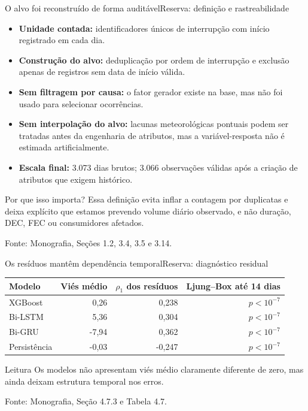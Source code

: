\documentclass[10pt]{beamer}
\newcommand{\source}[1]{%
  \par\vfill{\raggedleft\tiny\color{gray}Fonte: #1\par}%
}
\begin{document}
\begin{frame}[noframenumbering]{O alvo foi reconstruído de forma auditável}{Reserva: definição e rastreabilidade}
  \small
  \begin{itemize}
    \item \textbf{Unidade contada:} identificadores únicos de interrupção com início registrado em cada dia.
    \item \textbf{Construção do alvo:} deduplicação por ordem de interrupção e exclusão apenas de registros sem data de início válida.
    \item \textbf{Sem filtragem por causa:} o fator gerador existe na base, mas não foi usado para selecionar ocorrências.
    \item \textbf{Sem interpolação do alvo:} lacunas meteorológicas pontuais podem ser tratadas antes da engenharia de atributos, mas a variável-resposta não é estimada artificialmente.
    \item \textbf{Escala final:} 3.073 dias brutos; 3.066 observações válidas após a criação de atributos que exigem histórico.
  \end{itemize}

  \vspace{0.6em}
  \begin{block}{Por que isso importa?}
    Essa definição evita inflar a contagem por duplicatas e deixa explícito que estamos prevendo volume diário observado, e não duração, DEC, FEC ou consumidores afetados.
  \end{block}

  \source{Monografia, Seções 1.2, 3.4, 3.5 e 3.14.}
\end{frame}

\begin{frame}[noframenumbering]{Os resíduos mantêm dependência temporal}{Reserva: diagnóstico residual}
  \centering
  \begin{tabular}{lrrr}
    \toprule
    \textbf{Modelo} & \textbf{Viés médio} & \textbf{$\rho_1$ dos resíduos} & \textbf{Ljung--Box até 14 dias} \\
    \midrule
    XGBoost & 0,26 & 0,238 & $p < 10^{-7}$ \\
    Bi-LSTM & 5,36 & 0,304 & $p < 10^{-7}$ \\
    Bi-GRU & -7,94 & 0,362 & $p < 10^{-7}$ \\
    Persistência & -0,03 & -0,247 & $p < 10^{-7}$ \\
    \bottomrule
  \end{tabular}

  \vspace{1em}
  \begin{block}{Leitura}
    Os modelos não apresentam viés médio claramente diferente de zero, mas ainda deixam estrutura temporal nos erros.
  \end{block}

  \source{Monografia, Seção 4.7.3 e Tabela 4.7.}
\end{frame}
\end{document}
